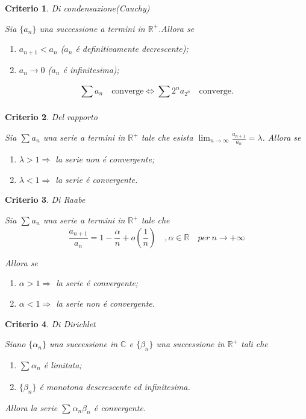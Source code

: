 \documentclass[a4paper, titlepage]{report}%
\theoremstyle{definition} %
\theoremstyle{plain}
\theoremstyle{plain}
\theoremstyle{remark}
\theoremstyle{remark}
\theoremstyle{plain}
\newtheorem*{criterio}{Criterio}
\theoremstyle{plain}
\theoremstyle{plain}
\theoremstyle{plain}
\theoremstyle{plain}
\begin{document}
\begin{criterio}{Di condensazione(Cauchy)}

    Sia $\{a_n\}$ una successione a termini in $\mathbb{R}^+$.Allora se
  \begin{enumerate}
    \item $a_{n+1}<a_n$ ($a_n $ \'e definitivamente decrescente);
    \item $a_n \rightarrow 0$ ($a_n$ \'e infinitesima);
  \end{enumerate}
\[
    \sum_{}^{}a_n \quad \text{converge}  \Longleftrightarrow \sum_{}^{}2^na_{2^n} 
    \quad \text{converge}.
\]
\end{criterio}
\begin{criterio}{Del rapporto}
    
    Sia $\sum_{}^{}a_n$ una serie a termini in $\mathbb{R}^+$ tale che
    esista $\lim_{n \to \infty} \frac{a_{n+1}}{a_n} = \lambda$.
    Allora se 
    \begin{enumerate}
        \item $\lambda>1 \Longrightarrow $ la serie non \'e convergente;
        \item $\lambda<1 \Longrightarrow $ la serie \'e convergente.
    \end{enumerate}
\end{criterio}
\begin{criterio}{Di Raabe}
    
    Sia $\sum_{}^{}a_n$ una serie a termini in $\mathbb{R}^+$ tale che
\[
        \frac{a_{n+1}}{a_n} = 1 - \frac{\alpha}{n} + o(\frac{1}{n}) 
        \quad , \alpha \in \mathbb{R} \quad per \ n \rightarrow +\infty
\]

    Allora se 
    \begin{enumerate}
        \item $\alpha>1 \Longrightarrow $ la serie \'e convergente;
        \item $\alpha<1 \Longrightarrow $ la serie non \'e convergente.
    \end{enumerate}
\end{criterio}
\begin{criterio}{Di Dirichlet}
    
    Siano $\{\alpha_n\}$ una successione in $\mathbb{C}$ e $\{ \beta_n\}$ una successione in $\mathbb{R}^+$ tali che
    \begin{enumerate}
        \item $\sum_{}^{}\alpha_n$ \'e limitata;
        \item $\{ \beta_n\}$ \'e monotona descrescente ed infinitesima.
    \end{enumerate}

    Allora la serie $\sum_{}^{}\alpha_n\beta_n$ \'e convergente.
\end{criterio}
    
\end{document}

